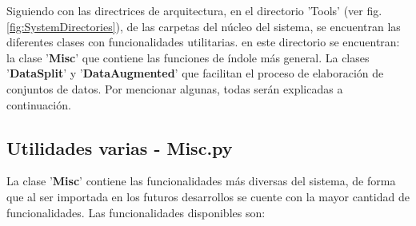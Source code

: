     Siguiendo con las directrices de arquitectura, en el directorio 'Tools' (ver fig. \ref{fig:SystemDirectories}), de las carpetas del núcleo del sistema, se encuentran las diferentes clases con funcionalidades utilitarias. en este directorio se encuentran: la clase '\textbf{Misc}' que contiene las funciones de índole más general. La clases '\textbf{DataSplit}' y '\textbf{DataAugmented}' que facilitan el proceso de elaboración de conjuntos de datos. Por mencionar algunas, todas serán explicadas a continuación.
    
    \subsection{Utilidades varias - Misc.py}
    \label{sub:MiscClass}
        La clase '\textbf{Misc}' contiene las funcionalidades más diversas del sistema, de forma que al ser importada en los futuros desarrollos se cuente con la mayor cantidad de funcionalidades. Las funcionalidades disponibles son:
    
